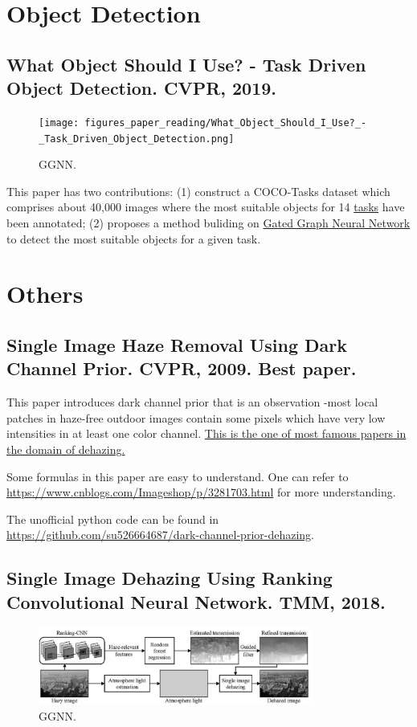 \documentclass[10pt,onecolumn]{book}
\begin{document}
\chapter{Object Detection}
\section{What Object Should I Use? - Task Driven Object Detection. CVPR, 2019.}
\begin{figure}[h]
\centering
\texttt{[image: figures\_paper\_reading/What\_Object\_Should\_I\_Use?\_-\_Task\_Driven\_Object\_Detection.png]}
\caption{GGNN.}
\label{fig}
\end{figure}

This paper has two contributions:
(1) construct a COCO-Tasks dataset which comprises about 40,000 images where the most suitable objects for 14 \uline{tasks} have been annotated;
(2) proposes a method buliding on \uline{Gated Graph Neural Network} to detect the most suitable objects for a given task. 

\chapter{Others}
\section{Single Image Haze Removal Using Dark Channel Prior. CVPR, 2009. Best paper.}
This paper introduces dark channel prior that is an observation -most local patches in haze-free outdoor images contain some pixels which have very low intensities in at least one color channel. \uline{This is the one of most famous papers in the domain of dehazing.} 

Some formulas in this paper are easy to understand. One can refer to \url{https://www.cnblogs.com/Imageshop/p/3281703.html} for more understanding. 

The unofficial python code can be found in \url{https://github.com/su526664687/dark-channel-prior-dehazing}.

\section{Single Image Dehazing Using Ranking Convolutional Neural Network. TMM, 2018.}
\begin{figure}[h]
\centering
\includegraphics[width=0.8\textwidth]{figures_paper_reading/Single_Image_Dehazing_Using_Ranking_Convolutional_Neural_Network.png}
\caption{GGNN.}
\label{fig}
\end{figure}
\end{document}
